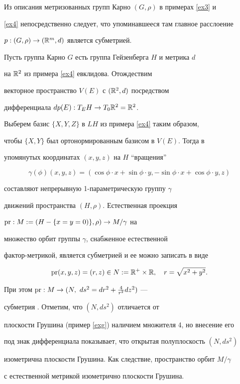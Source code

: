\begin{exams}


\label{ex12}


Из описания метризованных групп Карно $(G,\rho)$ в примерах \ref{ex3} и


\ref{ex4} непосредственно следует, что упоминавшееся там главное расслоение


$p: (G,\rho) \rightarrow (\Bbb{R}^{m},d)$ является субметрией.


\end{exams}





\begin{exams}


\label{ex13}


Пусть группа Карно $G$ есть группа Гейзенберга $H$ и метрика $d$


на $\Bbb{R}^{2}$ из примера \ref{ex4} евклидова. Отождествим


векторное пространство $V(E)$ с $(\Bbb{R}^{2},d)$ посредством


дифференциала $dp(E): T_{E}H \rightarrow T_{0}\Bbb{R}^{2}= \Bbb{R}^{2}$.


Выберем базис $\{X,Y,Z\}$ в $LH$ из примера \ref{ex4} таким образом,


чтобы $\{X,Y\}$ был ортонормированным базисом в $V(E)$. Тогда в


упомянутых координатах $(x,y,z)$ на $H$ ``вращения''


$$


\gamma(\phi)(x,y,z)= (\cos\phi\cdot x + \sin\phi\cdot y,-\sin\phi\cdot x +


\cos\phi\cdot y,z)


$$


составляют непрерывную 1-параметрическую группу $\gamma$


движений пространства $(H,\rho)$. Естественная проекция


$\operatorname{pr}:M:= (H-\{x=y=0)\},\rho ) \rightarrow M/\gamma$ на


множество орбит группы $\gamma$, снабженное естественной


фактор-метрикой, является субметрией и ее можно записать в виде


$$


\PR(x,y,z)=(r,z) \in N:=\Bbb{R}^{+} \times \Bbb{R},\quad r=\sqrt{x^{2}+y^{2}}.


$$


При этом $\PR: M \rightarrow (N,\ ds^{2}=dr^{2}+ \frac{4}{r^{2}}dz^{2})$ ---


субметрия \cite{F}. Отметим, что $(N,ds^{2})$ отличается от


плоскости Грушина (пример \ref{exg}) наличием множителя 4, но внесение его


под знак дифференциала показывает, что открытая полуплоскость $(N,ds^{2})$


изометрична плоскости Грушина. Как следствие, пространство орбит $M/\gamma$


с естественной метрикой изометрично плоскости Грушина.


\end{exams}





